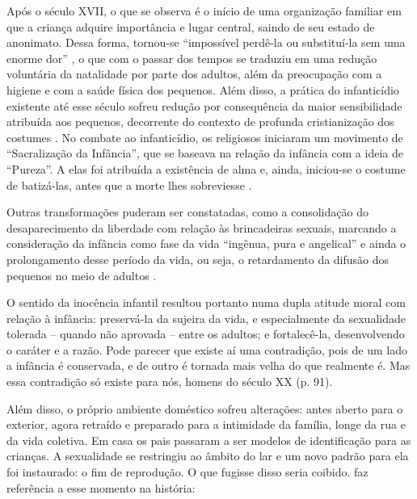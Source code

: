 
Após o século XVII, o que se observa é o início de uma organização familiar em que a criança adquire importância e lugar central, saindo de seu estado de anonimato. Dessa forma, tornou-se ``impossível perdê-la ou substituí-la sem uma enorme dor'' \cite[p. xi]{ARIES2011}, o que com o passar dos tempos se traduziu em uma redução voluntária da natalidade por parte dos adultos, além da preocupação com a higiene e com a saúde física dos pequenos. Além disso, a prática do infanticídio existente até esse século sofreu redução por consequência da maior sensibilidade atribuída aos pequenos, decorrente do contexto de profunda cristianização dos costumes \cite{ARIES2011}. No combate ao infanticídio, os religiosos iniciaram um movimento de ``Sacralização da Infância'', que se baseava na relação da infância com a ideia de ``Pureza''. A elas foi atribuída a existência de alma e, ainda, iniciou-se o costume de batizá-las, antes que a morte lhes sobreviesse \cite[p. 34]{SANTOS1994}.

Outras transformações puderam ser constatadas, como a consolidação do desaparecimento da liberdade com relação às brincadeiras sexuais, marcando a consideração da infância como fase da vida ``ingênua, pura e angelical'' e ainda o prolongamento desse período da vida, ou seja, o retardamento da difusão dos pequenos no meio de adultos \cite{ARIES2011}. 

\begin{citacao}
	O sentido da inocência infantil resultou portanto numa dupla atitude moral com relação à infância: preservá-la da sujeira da vida, e especialmente da sexualidade tolerada -- quando não aprovada -- entre os adultos; e fortalecê-la, desenvolvendo o caráter e a razão. Pode parecer que existe aí uma contradição, pois de um lado a infância é conservada, e de outro é tornada mais velha do que realmente é. Mas essa contradição só existe para nós, homens do século XX (p. 91).
\end{citacao}

Além disso, o próprio ambiente doméstico sofreu alterações: antes aberto para o exterior, agora retraído e preparado para a intimidade da família, longe da rua e da vida coletiva. Em casa os pais passaram a ser modelos de identificação para as crianças. A sexualidade se restringiu ao âmbito do lar e um novo padrão para ela foi instaurado: o fim de reprodução. O que fugisse disso seria coibido.  faz referência a esse momento na história:

